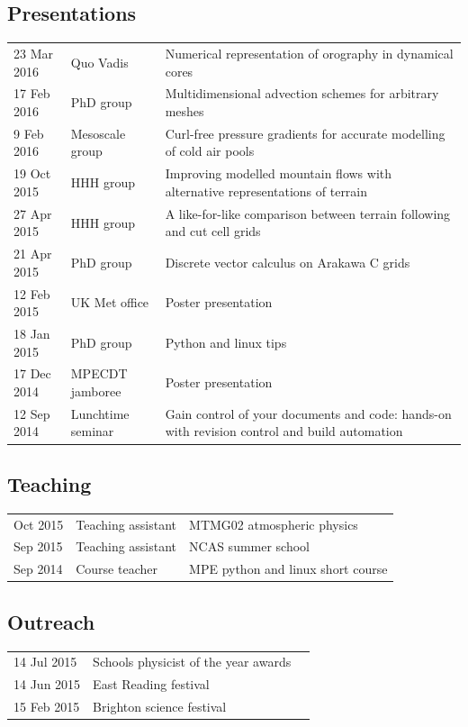 \documentclass[a4paper,11pt]{article}
\begin{document}
\subsection*{Presentations}
\begin{tabularx}{\linewidth}{l l X}
23 Mar 2016 & Quo Vadis & Numerical representation of orography in dynamical cores \\
17 Feb 2016 & PhD group & Multidimensional advection schemes for arbitrary meshes \\
9 Feb 2016 & Mesoscale group & Curl-free pressure gradients for accurate modelling of cold air pools \\
19 Oct 2015 & HHH group & Improving modelled mountain flows with alternative representations of terrain \\
27 Apr 2015 & HHH group & A like-for-like comparison between terrain following and cut cell grids \\
21 Apr 2015 & PhD group & Discrete vector calculus on Arakawa C grids \\
12 Feb 2015 & UK Met office & Poster presentation \\
18 Jan 2015 & PhD group & Python and linux tips \\
17 Dec 2014 & MPECDT jamboree & Poster presentation \\
12 Sep 2014 & Lunchtime seminar  & Gain control of your documents and code: hands-on with revision control and build automation \\
\end{tabularx}

\subsection*{Teaching}
\begin{tabular}{l l l}
Oct 2015 & Teaching assistant & MTMG02 atmospheric physics \\
Sep 2015 & Teaching assistant & NCAS summer school \\
Sep 2014 & Course teacher & MPE python and linux short course \\
\end{tabular}

\subsection*{Outreach}
\begin{tabular}{l l l}
14 Jul 2015 & Schools physicist of the year awards \\
14 Jun 2015 & East Reading festival \\
15 Feb 2015 & Brighton science festival \\
\end{tabular}
\end{document}

